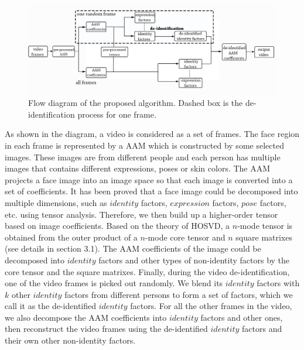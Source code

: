   	\begin{figure}[!htb]
	    \centering
		\includegraphics[scale = 0.6]{figure/VideoDiagram}
	    \caption{Flow diagram of the proposed algorithm. Dashed box is the de-identification process for one frame.}
	    \label{fig:video_diagram}
	\end{figure}
  	
  	As shown in the diagram, a video is considered as a set of frames. The face region in each frame is represented by
  	a AAM which is constructed by some selected images. These images are from different people and each person has 
  	multiple images that contains different expressions, poses or skin colors. The AAM projects a face image into an 
  	image space so that each image is converted into a set of coefficients.
  	It has been proved that a face image could be decomposed into multiple dimensions, such as $identity$ factors, 
  	$expression$ factors, $pose$ factors, etc. \cite{VasilescuT03,TPAMI09,Feng12} using tensor analysis.
  	Therefore, we then build up a higher-order tensor based on image coefficients. 
  	Based on the theory of HOSVD, a $n$-mode tensor is obtained from the outer product of a $n$-mode core tensor and $n$ 
  	square matrixes (see details in section 3.1). The AAM coefficients of the image could be decomposed into $identity$ 
  	factors and other types of non-identity factors by the core tensor and the square matrixes. Finally, during the 
  	video de-identification, one of the video frames is picked out randomly. We blend its $identity$ factors with $k$ other $identity$ 
  	factors from different persons to form a set of factors, which we call it as the de-identified $identity$ factors. 
  	For all the other frames in the video, we also decompose the AAM coefficients into $identity$ factors and 
  	other ones, then reconstruct the video frames using the de-identified $identity$ factors and their own other non-identity factors.



